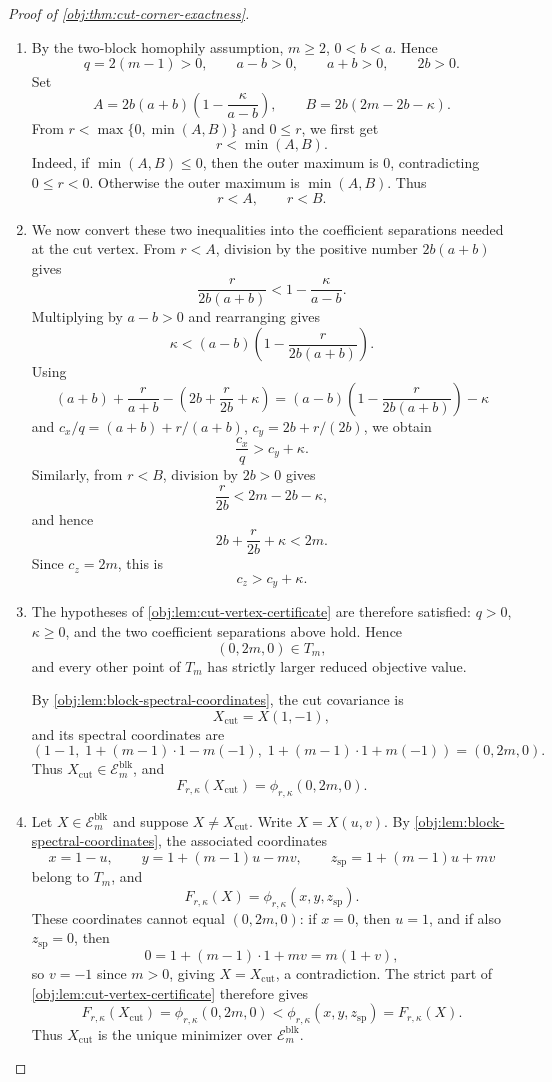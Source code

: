 \documentclass[11pt]{article}
\begin{document}
\begin{proof}[Proof of \cref{obj:thm:cut-corner-exactness}]
\begin{enumerate}
\item
By the two-block homophily assumption, \(m\ge2\), \(0<b<a\). Hence
\[
q=2(m-1)>0,\qquad a-b>0,\qquad a+b>0,\qquad 2b>0 .
\]
Set
\[
A=2b(a+b)\left(1-\frac{\kappa}{a-b}\right),
\qquad
B=2b(2m-2b-\kappa).
\]
From \(r<\max\{0,\min(A,B)\}\) and \(0\le r\), we first get
\[
r<\min(A,B).
\]
Indeed, if \(\min(A,B)\le0\), then the outer maximum is \(0\), contradicting
\(0\le r<0\). Otherwise the outer maximum is \(\min(A,B)\). Thus
\[
r<A,\qquad r<B .
\]

\item
We now convert these two inequalities into the coefficient separations needed at the cut vertex.
From \(r<A\), division by the positive number \(2b(a+b)\) gives
\[
\frac{r}{2b(a+b)}
<
1-\frac{\kappa}{a-b}.
\]
Multiplying by \(a-b>0\) and rearranging gives
\[
\kappa
<
(a-b)\left(1-\frac{r}{2b(a+b)}\right).
\]
Using
\[
(a+b)+\frac{r}{a+b}
-\left(2b+\frac{r}{2b}+\kappa\right)
=
(a-b)\left(1-\frac{r}{2b(a+b)}\right)-\kappa
\]
and \(c_x/q=(a+b)+r/(a+b)\), \(c_y=2b+r/(2b)\), we obtain
\[
\frac{c_x}{q}>c_y+\kappa .
\]
Similarly, from \(r<B\), division by \(2b>0\) gives
\[
\frac{r}{2b}<2m-2b-\kappa,
\]
and hence
\[
2b+\frac{r}{2b}+\kappa<2m.
\]
Since \(c_z=2m\), this is
\[
c_z>c_y+\kappa .
\]

\item
The hypotheses of \cref{obj:lem:cut-vertex-certificate} are therefore satisfied: \(q>0\), \(\kappa\ge0\), and the two coefficient separations above hold. Hence
\[
(0,2m,0)\in T_m,
\]
and every other point of \(T_m\) has strictly larger reduced objective value.

By \cref{obj:lem:block-spectral-coordinates}, the cut covariance is
\[
X_{\mathrm{cut}}=X(1,-1),
\]
and its spectral coordinates are
\[
(1-1,\;1+(m-1)\cdot1-m(-1),\;1+(m-1)\cdot1+m(-1))
=(0,2m,0).
\]
Thus \(X_{\mathrm{cut}}\in\mathcal E_m^{\mathrm{blk}}\), and
\[
F_{r,\kappa}(X_{\mathrm{cut}})
=
\phi_{r,\kappa}(0,2m,0).
\]

\item
Let \(X\in\mathcal E_m^{\mathrm{blk}}\) and suppose \(X\ne X_{\mathrm{cut}}\). Write \(X=X(u,v)\). By \cref{obj:lem:block-spectral-coordinates}, the associated coordinates
\[
x=1-u,\qquad
y=1+(m-1)u-mv,\qquad
z_{\mathrm{sp}}=1+(m-1)u+mv
\]
belong to \(T_m\), and
\[
F_{r,\kappa}(X)=\phi_{r,\kappa}(x,y,z_{\mathrm{sp}}).
\]
These coordinates cannot equal \((0,2m,0)\): if \(x=0\), then \(u=1\), and if also
\(z_{\mathrm{sp}}=0\), then
\[
0=1+(m-1)\cdot1+mv=m(1+v),
\]
so \(v=-1\) since \(m>0\), giving \(X=X_{\mathrm{cut}}\), a contradiction. The strict part of \cref{obj:lem:cut-vertex-certificate} therefore gives
\[
F_{r,\kappa}(X_{\mathrm{cut}})
=
\phi_{r,\kappa}(0,2m,0)
<
\phi_{r,\kappa}(x,y,z_{\mathrm{sp}})
=
F_{r,\kappa}(X).
\]
Thus \(X_{\mathrm{cut}}\) is the unique minimizer over \(\mathcal E_m^{\mathrm{blk}}\).


\end{enumerate}
\end{proof}
\end{document}

